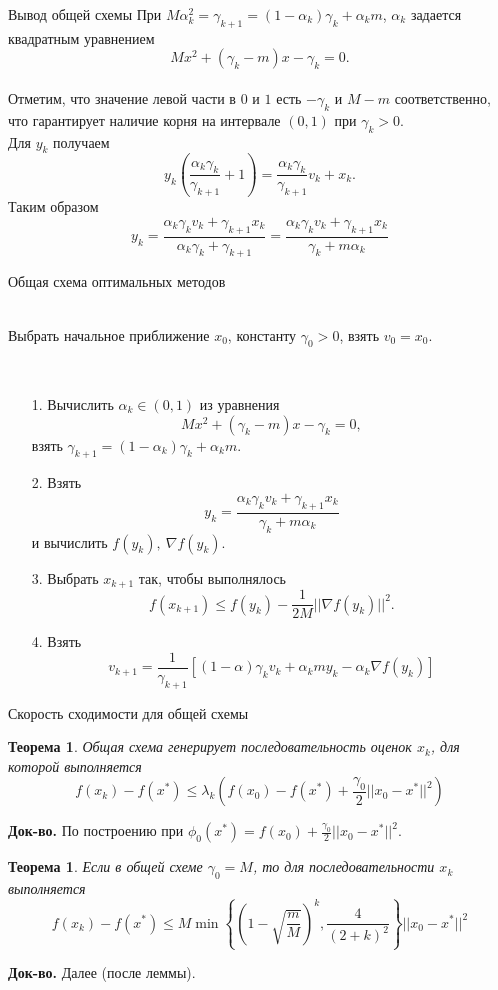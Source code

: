 \documentclass[10pt, handout]{beamer}
\newcounter{thm}
\newtheorem{theorem_ru}[thm]{Теорема}
\begin{document}
\begin{frame}{Вывод общей схемы}
При $M\alpha^2_k=\gamma_{k+1}=(1-\alpha_k)\gamma_k+\alpha_km$, $\alpha_k$ задается квадратным уравнением
$$
Mx^2+(\gamma_k-m)x-\gamma_k=0.
$$ 
\pause
\vspace{1em}\\

Отметим, что значение левой части в $0$ и $1$ есть $-\gamma_k$ и $M-m$ соответственно, что гарантирует наличие корня на интервале $(0,1)$ при $\gamma_k>0$.
\pause
\vspace{1em}\\
Для $y_k$ получаем
$$
y_k\left(\frac{\alpha_k\gamma_k}{\gamma_{k+1}}+1\right)=\frac{\alpha_k\gamma_k}{\gamma_{k+1}}v_k+x_k.
$$
Таким образом
$$
y_k=\frac{\alpha_k\gamma_kv_k+\gamma_{k+1}x_k}{\alpha_k\gamma_k+\gamma_{k+1}}=\frac{\alpha_k\gamma_kv_k+\gamma_{k+1}x_k}{\gamma_k+m\alpha_k}
$$
\end{frame}

\begin{frame}{Общая схема оптимальных методов}
\begin{description}[align=left]
\item[Инициализация.]~ \\
Выбрать начальное приближение $x_0$, константу $\gamma_0>0$, взять $v_0=x_0$.
\item[Итерация $k\geq 0$.]~ \\
\begin{itemize} 
\item[1.] Вычислить $\alpha_k\in (0,1)$ из уравнения
$$
Mx^2+(\gamma_k-m)x-\gamma_k=0,
$$
взять $\gamma_{k+1}=(1-\alpha_k)\gamma_k+\alpha_km$.
\item[2.] Взять
$$
y_k=\frac{\alpha_k\gamma_kv_k+\gamma_{k+1}x_k}{\gamma_k+m\alpha_k}
$$
и вычислить $f(y_k),~\nabla f(y_k)$.
\item[3.] Выбрать $x_{k+1}$ так, чтобы выполнялось
$$
f(x_{k+1})\leq f(y_k)-\frac{1}{2M}||\nabla f(y_k)||^2.
$$
\item[4.] Взять
$$
v_{k+1}= \frac{1}{\gamma_{k+1}}[(1-\alpha)\gamma_kv_k+\alpha_kmy_k-\alpha_k\nabla f(y_k)]
$$
\end{itemize}
\end{description}
\end{frame}


\begin{frame}{Скорость сходимости для общей схемы}
\begin{theorem_ru}
Общая схема генерирует последовательность оценок $x_k$, для которой выполняется
$$
f(x_k)-f(x^*)\leq \lambda_k\left(f(x_0)-f(x^*)+\frac{\gamma_0}{2}||x_0-x^*||^2\right)
$$
\end{theorem_ru}
\textbf{Док-во.} По построению при $\phi_0(x^*)=f(x_0)+\frac{\gamma_0}{2}||x_0-x^*||^2$.
\begin{theorem_ru}
Если в общей схеме $\gamma_0=M$, то для последовательности $x_k$ выполняется
$$
f(x_k)-f(x^*)\leq M\min\left\{\left(1-\sqrt{\frac{m}{M}}\right)^k, \frac{4}{(2+k)^2}\right\}||x_0-x^*||^2
$$
\end{theorem_ru}
\textbf{Док-во.} Далее (после леммы). 
\end{frame}
\end{document}
